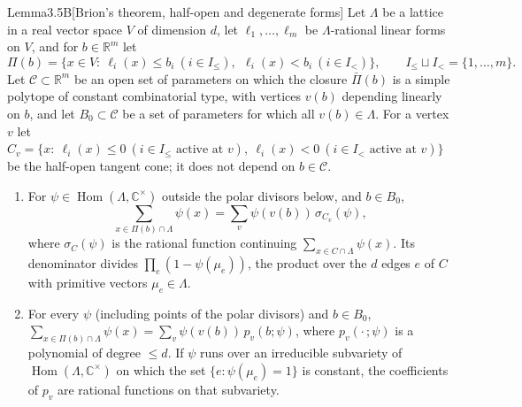 \documentclass[12pt,letterpaper]{article}
\numberwithin{equation}{section}
\theoremstyle{plain}
\theoremstyle{remark}
\theoremstyle{plain}
\theoremstyle{definition}
\theoremstyle{remark}
\theoremstyle{remark}
\DeclareMathOperator{\Hom}{Hom}
\begin{document}
\begin{fixedplain}{Lemma}{3.5B}[Brion's theorem, half-open and degenerate forms]\label{lem:3.5B}
Let $\Lambda$ be a lattice in a real vector space $V$ of dimension $d$, let $\ell_1,\dots,\ell_m$ be $\Lambda$-rational linear forms on $V$, and for $b\in\mathbb{R}^m$ let
\[
\Pi(b)=\{x\in V:\ \ell_i(x)\le b_i\ (i\in I_\le),\ \ \ell_i(x)<b_i\ (i\in I_<)\},\qquad I_\le\sqcup I_<=\{1,\dots,m\}.
\]
Let $\mathcal C\subset\mathbb{R}^m$ be an open set of parameters on which the closure $\bar\Pi(b)$ is a simple polytope of constant combinatorial type, with vertices $v(b)$ depending linearly on $b$, and let $B_0\subset\mathcal C$ be a set of parameters for which all $v(b)\in\Lambda$. For a vertex $v$ let $C_v=\{x:\ \ell_i(x)\le0\ (i\in I_\le\text{ active at }v),\ \ell_i(x)<0\ (i\in I_<\text{ active at }v)\}$ be the half-open tangent cone; it does not depend on $b\in\mathcal C$.
\begin{enumerate}[label=(\roman*)]
\item For $\psi\in\Hom(\Lambda,\mathbb{C}^\times)$ outside the polar divisors below, and $b\in B_0$,
\[
\sum_{x\in\Pi(b)\cap\Lambda}\psi(x)=\sum_{v}\psi(v(b))\,\sigma_{C_v}(\psi),
\]
where $\sigma_{C}(\psi)$ is the rational function continuing $\sum_{x\in C\cap\Lambda}\psi(x)$. Its denominator divides $\prod_{e}(1-\psi(\mu_e))$, the product over the $d$ edges $e$ of $C$ with primitive vectors $\mu_e\in\Lambda$.
\item For every $\psi$ (including points of the polar divisors) and $b\in B_0$, $\sum_{x\in\Pi(b)\cap\Lambda}\psi(x)=\sum_v\psi(v(b))\,p_v(b;\psi)$, where $p_v(\cdot\,;\psi)$ is a polynomial of degree $\le d$. If $\psi$ runs over an irreducible subvariety of $\Hom(\Lambda,\mathbb{C}^\times)$ on which the set $\{e:\psi(\mu_e)=1\}$ is constant, the coefficients of $p_v$ are rational functions on that subvariety.
\end{enumerate}
\end{fixedplain}
\end{document}
